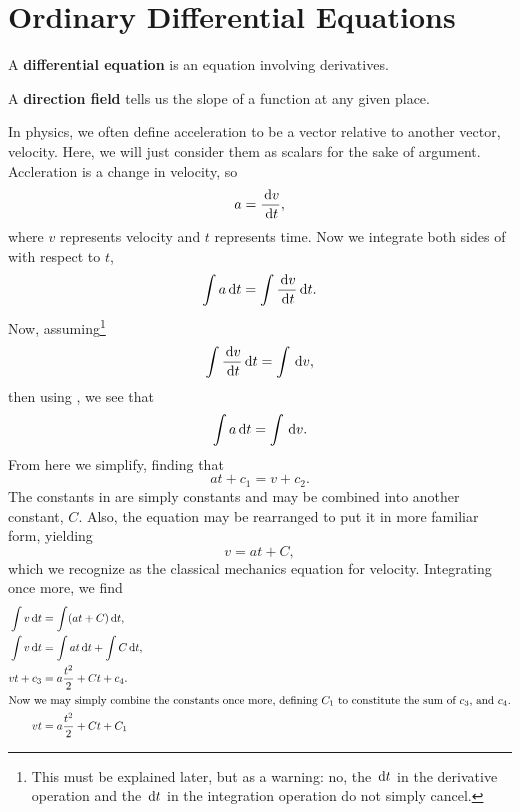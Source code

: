 \chapter{Ordinary Differential Equations}
\begin{defn}
  A \textbf{differential equation} is an equation involving derivatives.
\end{defn}
\begin{defn}
  A \textbf{direction field} tells us the slope of a function at any given place.
\end{defn}
\begin{ex}
    In physics, we often define acceleration to be a vector relative to another vector, velocity.
    Here, we will just consider them as scalars for the sake of argument.
    Accleration is a change in velocity, so
    \begin{equation}
        a = \frac{\,\mathrm{d} v}{\,\mathrm{d} t},
        \label{eq:acceleration}
    \end{equation}
    where $v$ represents velocity and $t$ represents time.
    Now we integrate both sides of  with respect to $t$,
    \begin{equation}
        \int a \,\mathrm{d} t = \int \frac{\,\mathrm{d} v}{\,\mathrm{d} t} \,\mathrm{d} t.
        \label{eq:intaccel}
    \end{equation}
    Now, assuming\footnote{This must be explained later, but as a warning: no, the $\,\mathrm{d} t$ in the derivative operation and the $\,\mathrm{d} t$ in the integration operation do not simply cancel.}
    \begin{equation}
        \int \frac{\,\mathrm{d} v}{\,\mathrm{d} t} \,\mathrm{d} t = \int \,\mathrm{d} v,
        \label{eq:handwave}
    \end{equation}
    then using , we see that
    \begin{equation}
        \int a \,\mathrm{d} t = \int \,\mathrm{d} v.
        \label{eq:naughtint}
    \end{equation}
    From here we simplify, finding that
    \begin{equation}
        at + c_1 = v + c_2.
        \label{eq:almostvelocity}
    \end{equation}
    The constants in  are simply constants and may be combined into another constant, $C$.
    Also, the equation may be rearranged to put it in more familiar form, yielding
    \begin{equation}
        v = at + C,
        \label{eq:velocity}
    \end{equation}
    which we recognize as the classical mechanics equation for velocity.
    Integrating once more, we find
    \begin{align*}
        \int v \,\mathrm{d} t &= \int (at + C) \,\mathrm{d} t, \\
        \int v \,\mathrm{d} t &= \int at \,\mathrm{d} t + \int C \,\mathrm{d} t, \\
        vt + c_3  &= a \frac{t^2}{2} + Ct + c_4. \\
        \intertext{Now we may simply combine the constants once more, defining $C_1$ to constitute the sum of $c_3$, and $c_4$.}
        vt &= a \frac{t^2}{2} + Ct + C_1
    \end{align*}
\end{ex}

